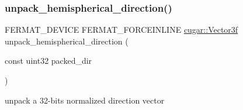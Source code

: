 \subsubsection{\texorpdfstring{unpack\+\_\+hemispherical\+\_\+direction()}{unpack\_hemispherical\_direction()}}
{\footnotesize\ttfamily F\+E\+R\+M\+A\+T\+\_\+\+D\+E\+V\+I\+CE F\+E\+R\+M\+A\+T\+\_\+\+F\+O\+R\+C\+E\+I\+N\+L\+I\+NE \hyperlink{structcugar_1_1_vector}{cugar\+::\+Vector3f} unpack\+\_\+hemispherical\+\_\+direction (\begin{DoxyParamCaption}\item[{const uint32}]{packed\+\_\+dir }\end{DoxyParamCaption})}

unpack a 32-\/bits normalized direction vector 